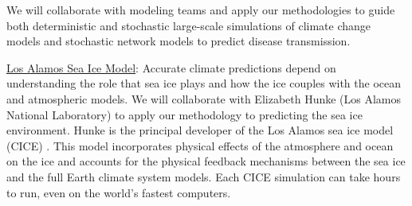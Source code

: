 \documentclass[11pt]{NSFamsart}
\newcommand{\Upara}[1]{\noindent\underline{\upshape #1}:}
\begin{document}
We will collaborate with modeling teams and apply our methodologies to guide both deterministic and stochastic large-scale simulations of climate change models and stochastic network models to predict disease transmission. 


\Upara{Los Alamos Sea Ice Model}
Accurate climate predictions depend on understanding the role that sea ice plays and how the ice couples with the ocean and atmospheric models.
We will collaborate with Elizabeth Hunke (Los Alamos National Laboratory) to apply our methodology to predicting the sea ice environment. Hunke is the principal developer of the Los Alamos sea ice model (CICE) \cite{hunke2017cice, hunke2010cice}. This model incorporates physical effects of the atmosphere and ocean on the ice and accounts for the physical feedback mechanisms between the sea ice and the full Earth climate system models. Each CICE simulation can take hours to run, even on the world's fastest computers.
\end{document}
